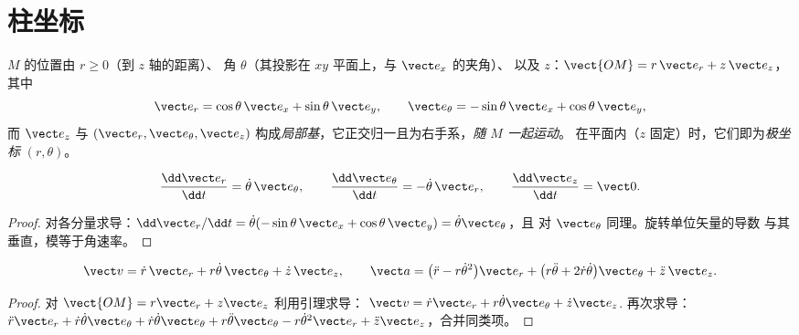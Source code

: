 \section{柱坐标}

\begin{definition}[柱坐标与基]\label{def:b1:point-kinematics:cylindrical}
 $M$ 的位置由 $r \geq 0$（到 $z$ 轴的距离）、
角 $\theta$（其投影在 $xy$ 平面上，与 $\vect e_x$ 的夹角）、
以及 $z$：$\vect{OM} = r\,\vect e_r + z\,\vect e_z$，其中
\[
\vect e_r = \cos\theta\,\vect e_x + \sin\theta\,\vect e_y, \qquad
\vect e_\theta = -\sin\theta\,\vect e_x + \cos\theta\,\vect e_y,
\]
而 $\vect e_z$ 与 $(\vect e_r, \vect e_\theta,
\vect e_z)$ 构成\emph{局部基}，它正交归一且为右手系，\emph{随 $M$ 一起运动}。
在平面内（$z$ 固定）时，它们即为\emph{极坐标} $(r, \theta)$。
\end{definition}

\begin{lemma}[局部基的导数]\label{lem:b1:point-kinematics:basisderiv}
\[
\frac{\dd\vect e_r}{\dd t} = \dot\theta\,\vect e_\theta, \qquad
\frac{\dd\vect e_\theta}{\dd t} = -\dot\theta\,\vect e_r, \qquad
\frac{\dd\vect e_z}{\dd t} = \vect 0 .
\]
\end{lemma}

\begin{proof}
对各分量求导：$\dd\vect e_r/\dd t = \dot\theta(-\sin\theta\,
\vect e_x + \cos\theta\,\vect e_y) = \dot\theta\vect e_\theta$，且
对 $\vect e_\theta$ 同理。旋转单位矢量的导数
与其垂直，模等于角速率。
\end{proof}

\begin{theorem}[柱坐标中的速度与加速度]\label{thm:b1:point-kinematics:cylindrical}
\[
\vect v = \dot r\,\vect e_r + r\dot\theta\,\vect e_\theta + \dot z\,\vect e_z,
\qquad
\vect a = \big(\ddot r - r\dot\theta^2\big)\vect e_r
+ \big(r\ddot\theta + 2\dot r\dot\theta\big)\vect e_\theta + \ddot z\,\vect e_z .
\]
\end{theorem}

\begin{proof}
对 $\vect{OM} = r\vect e_r + z\vect e_z$ 利用引理求导：
$\vect v = \dot r\vect e_r + r\dot\theta\vect e_\theta + \dot z\vect e_z$.
再次求导：$\ddot r\vect e_r + \dot r\dot\theta\vect e_\theta +
\dot r\dot\theta\vect e_\theta + r\ddot\theta\vect e_\theta - r\dot\theta^2
\vect e_r + \ddot z\vect e_z$，合并同类项。
\end{proof}

